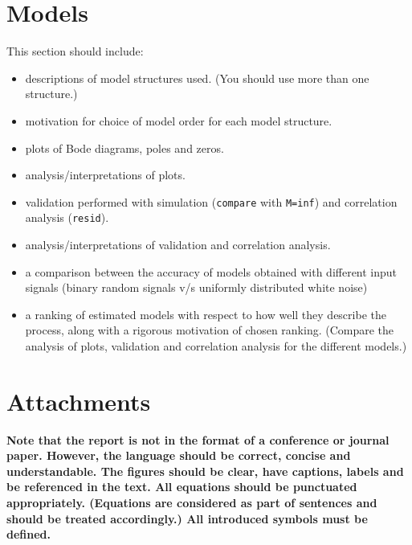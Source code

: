 \documentclass[10pt,a4paper]{article}
\begin{document}
\section{Models}
This section should include:
\begin{itemize}
    \item descriptions of model structures used. (You should use more than one structure.)
    \item motivation for choice of model order for each model structure.
    \item plots of Bode diagrams, poles and zeros.
    \item analysis/interpretations of plots.
   \item validation performed with simulation (\texttt{compare} with \texttt{M=inf}) and correlation analysis (\texttt{resid}).
   \item analysis/interpretations of validation and correlation analysis.
   \item a comparison between the accuracy of models obtained with different input signals (binary random signals v/s uniformly distributed white noise)
   \item  a ranking of estimated models with respect to how well they describe the process, along with a rigorous motivation of chosen ranking. (Compare the analysis of plots, validation and correlation analysis for the different models.)
\end{itemize}

\newpage
\section*{Attachments}
    
	
	
	

{\bf Note that the report is not in the format of a conference or journal paper. However, the language should be correct, concise and understandable. The figures should be clear, have captions, labels and be referenced in the text. All equations should be punctuated appropriately. (Equations are considered as part of sentences and should be treated accordingly.) All introduced symbols must be defined.}
\end{document}
